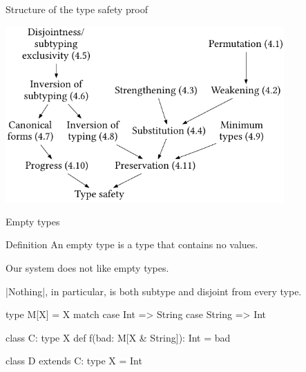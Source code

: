 \documentclass[10pt]{beamer}
\newenvironment{slide}[2][]
  {\begin{frame}[fragile,environment=slide,#1]{#2}}
  {\end{frame}}
\begin{document}
\begin{slide}{Structure of the type safety proof}
\begin{center}
\includegraphics[width=0.8\textwidth]{figures/FMProofStructure.pdf}
\end{center}
\end{slide}

\begin{slide}{Empty types}

\begin{block}{Definition}
An empty type is a type that contains no values.
\end{block}

\pause

Our system does not like empty types.

|Nothing|, in particular, is both subtype and disjoint from every type.

\pause

\begin{code}
type M[X] = X match
  case Int => String
  case String => Int

class C:
  type X
  def f(bad: M[X & String]): Int = bad

class D extends C:
  type X = Int
\end{code}
\end{slide}
\end{document}
